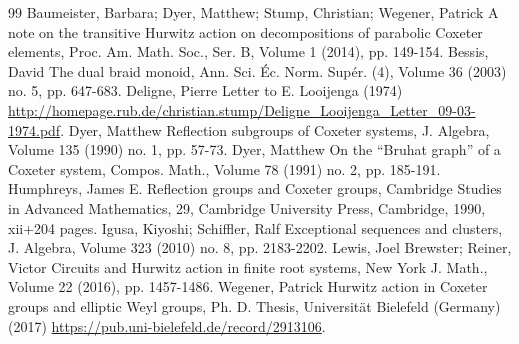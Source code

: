 \begin{thebibliography}{99}
 Baumeister, Barbara; Dyer, Matthew; Stump, Christian; Wegener, Patrick A note on the transitive Hurwitz action on decompositions of parabolic Coxeter elements, Proc. Am. Math. Soc., Ser. B, Volume 1 (2014), pp. 149-154.
 Bessis, David The dual braid monoid, Ann. Sci. Éc. Norm. Supér. (4), Volume 36 (2003) no. 5, pp. 647-683.
 Deligne, Pierre Letter to E. Looijenga (1974) \url{http://homepage.rub.de/christian.stump/Deligne_Looijenga_Letter_09-03-1974.pdf}.
 Dyer, Matthew Reflection subgroups of Coxeter systems, J. Algebra, Volume 135 (1990) no. 1, pp. 57-73.
 Dyer, Matthew On the “Bruhat graph” of a Coxeter system, Compos. Math., Volume 78 (1991) no. 2, pp. 185-191.
 Humphreys, James E. Reflection groups and Coxeter groups, Cambridge Studies in Advanced Mathematics, 29, Cambridge University Press, Cambridge, 1990, xii+204 pages.
 Igusa, Kiyoshi; Schiffler, Ralf Exceptional sequences and clusters, J. Algebra, Volume 323 (2010) no. 8, pp. 2183-2202.
 Lewis, Joel Brewster; Reiner, Victor Circuits and Hurwitz action in finite root systems, New York J. Math., Volume 22 (2016), pp. 1457-1486.
 Wegener, Patrick Hurwitz action in Coxeter groups and elliptic Weyl groups, Ph. D. Thesis, Universität Bielefeld (Germany) (2017) \url{https://pub.uni-bielefeld.de/record/2913106}.
\end{thebibliography}
